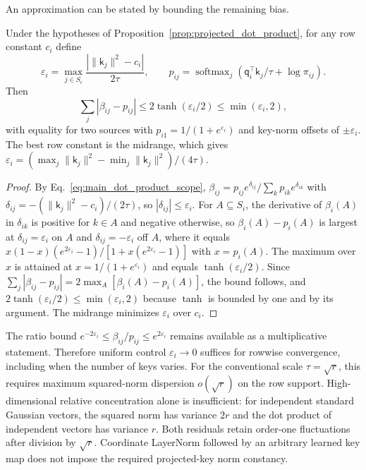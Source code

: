 \documentclass[twoside,11pt]{article}
\newcommand{\softmax}{\operatorname{softmax}}
\begin{document}
An approximation can be stated by bounding the remaining bias.
\begin{proposition}
\label{prop:sharp_bound}
Under the hypotheses of Proposition~\ref{prop:projected_dot_product}, for any row constant $c_i$ define
\begin{equation}
\varepsilon_i=\max_{j\in S_i}
\frac{|\|\mathsf k_j\|^2-c_i|}{2\tau},\qquad
p_{ij}=\softmax_j\left(\mathsf q_i^\top\mathsf k_j/\tau+\log\pi_{ij}\right).
\label{eq:projected_bias_error}
\end{equation}
Then
\begin{equation}
\sum_j|\beta_{ij}-p_{ij}|\le2\tanh(\varepsilon_i/2)\le\min(\varepsilon_i,2),
\label{eq:projected_softmax_bound}
\end{equation}
with equality for two sources with $p_{i1}=1/(1+e^{\varepsilon_i})$ and key-norm offsets of $\pm\varepsilon_i$. The best row constant is the midrange, which gives $\varepsilon_i=(\max_j\|\mathsf k_j\|^2-\min_j\|\mathsf k_j\|^2)/(4\tau)$.
\end{proposition}
\begin{proof}
By Eq.~\eqref{eq:main_dot_product_scope}, $\beta_{ij}=p_{ij}e^{\delta_{ij}}/\sum_kp_{ik}e^{\delta_{ik}}$ with $\delta_{ij}=-(\|\mathsf k_j\|^2-c_i)/(2\tau)$, so $|\delta_{ij}|\le\varepsilon_i$. For $A\subseteq S_i$, the derivative of $\beta_i(A)$ in $\delta_{ik}$ is positive for $k\in A$ and negative otherwise, so $\beta_i(A)-p_i(A)$ is largest at $\delta_{ij}=\varepsilon_i$ on $A$ and $\delta_{ij}=-\varepsilon_i$ off $A$, where it equals $x(1-x)(e^{2\varepsilon_i}-1)/[1+x(e^{2\varepsilon_i}-1)]$ with $x=p_i(A)$. The maximum over $x$ is attained at $x=1/(1+e^{\varepsilon_i})$ and equals $\tanh(\varepsilon_i/2)$. Since $\sum_j|\beta_{ij}-p_{ij}|=2\max_A[\beta_i(A)-p_i(A)]$, the bound follows, and $2\tanh(\varepsilon_i/2)\le\min(\varepsilon_i,2)$ because $\tanh$ is bounded by one and by its argument. The midrange minimizes $\varepsilon_i$ over $c_i$.
\end{proof}
The ratio bound $e^{-2\varepsilon_i}\le\beta_{ij}/p_{ij}\le e^{2\varepsilon_i}$ remains available as a multiplicative statement.
Therefore uniform control $\varepsilon_i\to0$ suffices for rowwise convergence, including when the number of keys varies. For the conventional scale $\tau=\sqrt r$, this requires maximum squared-norm dispersion $o(\sqrt r)$ on the row support. High-dimensional relative concentration alone is insufficient: for independent standard Gaussian vectors, the squared norm has variance $2r$ and the dot product of independent vectors has variance $r$. Both residuals retain order-one fluctuations after division by $\sqrt r$. Coordinate LayerNorm followed by an arbitrary learned key map does not impose the required projected-key norm constancy.
\end{document}
